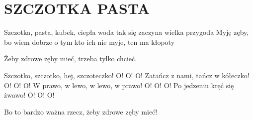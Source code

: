 \documentclass[../../../songbook.tex]{subfiles}
\begin{document}
\TabPositions{8cm} %
\section*{SZCZOTKA PASTA}
{}
\vspace{0.5cm}
Szczotka, pasta, kubek, ciepła woda	 \newline
tak się zaczyna wielka przygoda		 \newline
Myję zęby, bo wiem dobrze o tym		 \newline
kto ich nie myje, ten ma kłopoty		 \newline

Żeby zdrowe zęby mieć, trzeba tylko chcieć.  \newline

Szczotko, szczotko, hej, szczoteczko! O! O! O! 	 \newline
Zatańcz z nami, tańcz w kółeczko! O! O! O! 		 \newline
W prawo, w lewo, w lewo, w prawo! O! O! O! 		 \newline
Po jedzeniu kręć się żwawo! O! O! O! 			 \newline

Bo to bardzo ważna rzecz, żeby zdrowe zęby mieć! \newline
\end{document}
